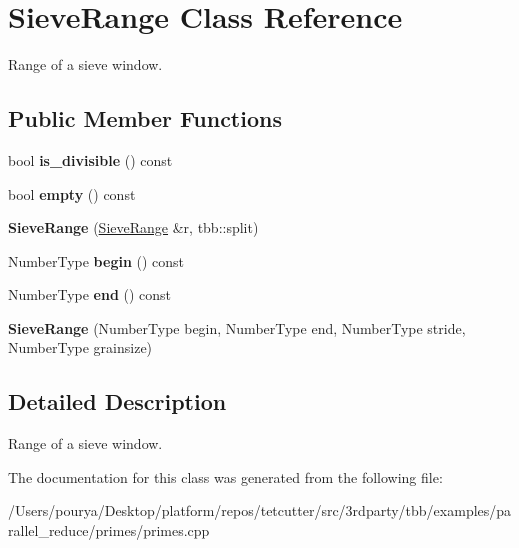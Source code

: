 \hypertarget{classSieveRange}{}\section{Sieve\+Range Class Reference}
\label{classSieveRange}


Range of a sieve window.  


\subsection*{Public Member Functions}
\begin{DoxyCompactItemize}
\item 
\hypertarget{classSieveRange_a3e2d2d521b120b7f0ef0129743e38028}{}bool {\bfseries is\+\_\+divisible} () const \label{classSieveRange_a3e2d2d521b120b7f0ef0129743e38028}

\item 
\hypertarget{classSieveRange_ad4fceede94f9ee7b5a6f1e4c40e9bc6f}{}bool {\bfseries empty} () const \label{classSieveRange_ad4fceede94f9ee7b5a6f1e4c40e9bc6f}

\item 
\hypertarget{classSieveRange_a74a3224afa69ca6279ce07ed2f394b66}{}{\bfseries Sieve\+Range} (\hyperlink{classSieveRange}{Sieve\+Range} \&r, tbb\+::split)\label{classSieveRange_a74a3224afa69ca6279ce07ed2f394b66}

\item 
\hypertarget{classSieveRange_add97efa540880c54ffadbf06b3816248}{}Number\+Type {\bfseries begin} () const \label{classSieveRange_add97efa540880c54ffadbf06b3816248}

\item 
\hypertarget{classSieveRange_a52d80977be2db46c83f96c08436a64c4}{}Number\+Type {\bfseries end} () const \label{classSieveRange_a52d80977be2db46c83f96c08436a64c4}

\item 
\hypertarget{classSieveRange_ab04ca3ad58dc145401aba66a03085dec}{}{\bfseries Sieve\+Range} (Number\+Type begin, Number\+Type end, Number\+Type stride, Number\+Type grainsize)\label{classSieveRange_ab04ca3ad58dc145401aba66a03085dec}

\end{DoxyCompactItemize}


\subsection{Detailed Description}
Range of a sieve window. 

The documentation for this class was generated from the following file\+:\begin{DoxyCompactItemize}
\item 
/\+Users/pourya/\+Desktop/platform/repos/tetcutter/src/3rdparty/tbb/examples/parallel\+\_\+reduce/primes/primes.\+cpp\end{DoxyCompactItemize}
